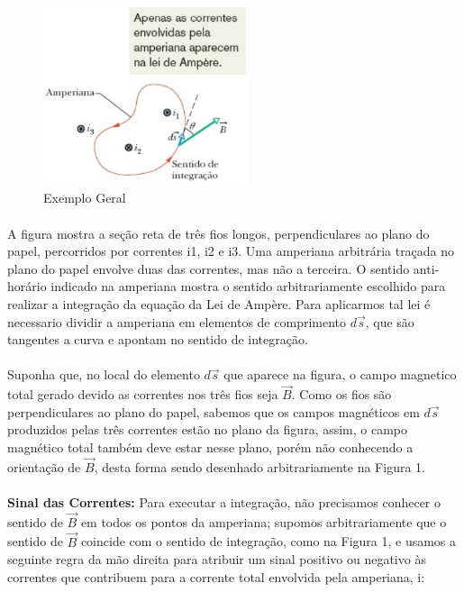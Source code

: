 \documentclass[a4paper, 12pt]{article}
\begin{document}
\begin{figure}[h]
    \begin{center}
        \includegraphics[width=60mm]{Capturar.PNG}
    \end{center}
    \caption{Exemplo Geral}
    \label{Fig. Exemplo}
\end{figure}

\paragraph{} A figura mostra a seção reta de três fios longos, perpendiculares ao plano do papel, percorridos por correntes i1, i2 e i3. Uma amperiana arbitrária traçada no plano do papel envolve duas das correntes, mas não a terceira. O sentido anti-horário indicado na amperiana mostra o sentido arbitrariamente escolhido para realizar a integração da equação da Lei de Ampère. Para aplicarmos tal lei é necessario dividir a amperiana em elementos de comprimento $d\overrightarrow{s}$, que são tangentes a curva e apontam no sentido de integração.

\paragraph{} Suponha que, no local do elemento $d\overrightarrow{s}$ que aparece na figura, o campo magnetico total gerado devido as correntes nos três fios seja $\overrightarrow{B}$. Como os fios são perpendiculares ao plano do papel, sabemos que os campos magnéticos em $d\overrightarrow{s}$ produzidos pelas três correntes estão no plano da figura, assim, o campo magnético total também deve estar nesse plano, porém não conhecendo a orientação de $\overrightarrow{B}$, desta forma sendo desenhado arbitrariamente na Figura 1.

\paragraph{} \textbf{Sinal das Correntes:} Para executar a integração, não precisamos conhecer o sentido de $\overrightarrow{B}$ em todos os pontos da amperiana; supomos arbitrariamente que o sentido de $\overrightarrow{B}$ coincide com o sentido de integração, como na Figura 1, e usamos a seguinte regra da mão direita para atribuir um sinal positivo ou negativo às correntes que contribuem para a corrente total envolvida pela amperiana, i:\\
\end{document}

